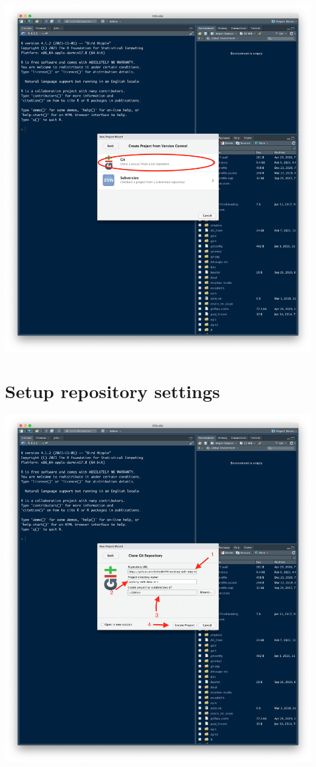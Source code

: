 \documentclass[
  12pt,
]{book}
\begin{document}
\includegraphics{images/clone_step4.png}

\hypertarget{setup-repository-settings}{%
\section{Setup repository settings}\label{setup-repository-settings}}

\includegraphics{images/clone_step5.png}
\end{document}
